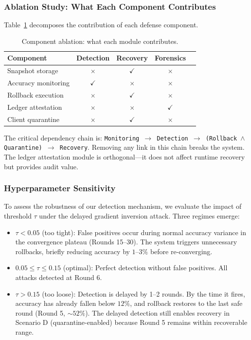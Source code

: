 \documentclass[conference]{IEEEtran}
\begin{document}
\subsubsection{Ablation Study: What Each Component Contributes}
Table~\ref{tab:ablation} decomposes the contribution of each defense component.

\begin{table}[t]
\centering
\caption{Component ablation: what each module contributes.}
\label{tab:ablation}
\vspace{-3pt}
\begin{tabular}{lcccc}
\toprule
\textbf{Component} & \textbf{Detection} & \textbf{Recovery} & \textbf{Forensics} \\
\midrule
Snapshot storage & $\times$ & $\checkmark$ & $\times$ \\
Accuracy monitoring & $\checkmark$ & $\times$ & $\times$ \\
Rollback execution & $\times$ & $\checkmark$ & $\times$ \\
Ledger attestation & $\times$ & $\times$ & $\checkmark$ \\
Client quarantine & $\times$ & $\checkmark$ & $\times$ \\
\bottomrule
\end{tabular}
\end{table}

The critical dependency chain is: \texttt{Monitoring $\rightarrow$ Detection $\rightarrow$ (Rollback $\land$ Quarantine) $\rightarrow$ Recovery}. Removing any link in this chain breaks the system. The ledger attestation module is orthogonal—it does not affect runtime recovery but provides audit value.

\subsubsection{Hyperparameter Sensitivity}
To assess the robustness of our detection mechanism, we evaluate the impact of threshold $\tau$ under the delayed gradient inversion attack. Three regimes emerge:

\begin{itemize}
    \item $\tau < 0.05$ (too tight): False positives occur during normal accuracy variance in the convergence plateau (Rounds 15--30). The system triggers unnecessary rollbacks, briefly reducing accuracy by $1$--$3\%$ before re-converging.
    \item $0.05 \leq \tau \leq 0.15$ (optimal): Perfect detection without false positives. All attacks detected at Round 6.
    \item $\tau > 0.15$ (too loose): Detection is delayed by 1--2 rounds. By the time it fires, accuracy has already fallen below $12\%$, and rollback restores to the last safe round (Round 5, $\sim 52\%$). The delayed detection still enables recovery in Scenario D (quarantine-enabled) because Round 5 remains within recoverable range.
\end{itemize}
\end{document}
